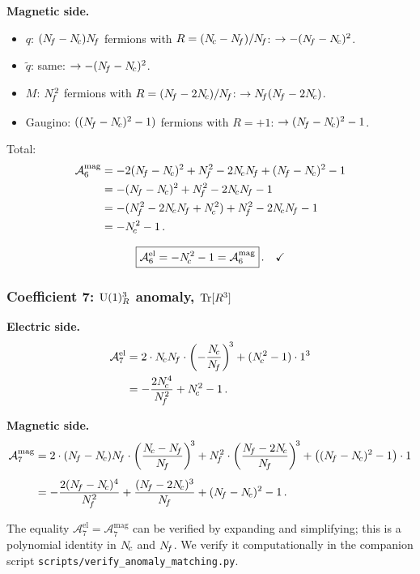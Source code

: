 \documentclass[11pt,a4paper]{article}
\begin{document}
\textbf{Magnetic side.}
\begin{itemize}
  \item $q$: $(N_{\!f} - N_{\!c})N_{\!f}$ fermions with $R = (N_{\!c} - N_{\!f})/N_{\!f}$:
    $\to -(N_{\!f} - N_{\!c})^2$.
  \item $\widetilde{q}$: same: $\to -(N_{\!f} - N_{\!c})^2$.
  \item $M$: $N_{\!f}^2$ fermions with $R = (N_{\!f} - 2N_{\!c})/N_{\!f}$:
    $\to N_{\!f}(N_{\!f} - 2N_{\!c})$.
  \item Gaugino: $((N_{\!f} - N_{\!c})^2 - 1)$ fermions with $R = +1$:
    $\to (N_{\!f} - N_{\!c})^2 - 1$.
\end{itemize}
Total:
\begin{align*}
  \mathcal{A}^{\text{mag}}_{6}
  &= -2(\Nf - \Nc)^2 + \Nf^2 - 2\Nc\Nf + (\Nf - \Nc)^2 - 1 \\
  &= -(\Nf - \Nc)^2 + \Nf^2 - 2\Nc\Nf - 1 \\
  &= -(\Nf^2 - 2\Nc\Nf + \Nc^2) + \Nf^2 - 2\Nc\Nf - 1 \\
  &= -\Nc^2 - 1\,.
\end{align*}

\begin{equation}\label{eq:anom6a}
  \boxed{\mathcal{A}^{\text{el}}_{6} = -N_{\!c}^2 - 1
    = \mathcal{A}^{\text{mag}}_{6}}\,.
  \quad\checkmark
\end{equation}

\subsubsection*{Coefficient 7: $\mathrm{U}(1)_R^3$ anomaly, $\mathrm{Tr}[R^3]$}

\textbf{Electric side.}
\begin{align*}
  \mathcal{A}^{\text{el}}_{7}
  &= 2 \cdot \Nc\Nf \cdot \left(-\frac{\Nc}{\Nf}\right)^{\!3}
  + (\Nc^2 - 1) \cdot 1^3 \\
  &= -\frac{2\Nc^4}{\Nf^2} + \Nc^2 - 1\,.
\end{align*}

\textbf{Magnetic side.}
\begin{align*}
  \mathcal{A}^{\text{mag}}_{7}
  &= 2 \cdot (\Nf - \Nc)\Nf \cdot \left(\frac{\Nc - \Nf}{\Nf}\right)^{\!3}
  + \Nf^2 \cdot \left(\frac{\Nf - 2\Nc}{\Nf}\right)^{\!3}
  + \bigl((\Nf - \Nc)^2 - 1\bigr) \cdot 1 \\[4pt]
  &= -\frac{2(\Nf - \Nc)^4}{\Nf^2}
  + \frac{(\Nf - 2\Nc)^3}{\Nf}
  + (\Nf - \Nc)^2 - 1\,.
\end{align*}

The equality $\mathcal{A}^{\text{el}}_{7} =
\mathcal{A}^{\text{mag}}_{7}$ can be verified by expanding and
simplifying; this is a polynomial identity in $N_{\!c}$ and $N_{\!f}$.  We verify
it computationally in the companion script
\texttt{scripts/verify\_anomaly\_matching.py}.
\end{document}
